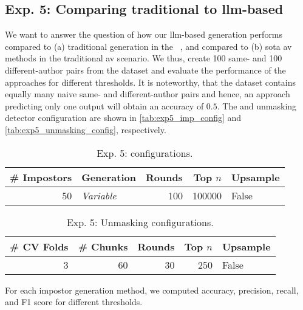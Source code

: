 \subsection{Exp. 5: Comparing traditional to \ac{llm}-based \imps{}}
\label{subsec:imp_gen}

We want to answer the question of how our \ac{llm}-based \imp{} generation performs compared to (a) traditional \imp{} generation in the \impAppr{}~\citep{koppel_determining_2014}, and compared to (b) \ac{sota} \ac{av} methods in the traditional \ac{av} scenario.
We thus, create 100 same- and 100 different-author pairs from the \dataStudent{} 
dataset and evaluate the performance of the approaches for different thresholds.
It is noteworthy, that the dataset contains equally many naive same- and different-author pairs and hence, an approach predicting only one output will obtain an accuracy of $0.5$.
The \impAppr{} and unmasking detector configuration are shown in \autoref{tab:exp5_imp_config} and \autoref{tab:exp5_unmasking_config}, respectively.

\begin{table}[h]
\centering\small
\caption{Exp. 5: \impAppr{} configurations.}
\label{tab:exp5_imp_config}
\begin{tabular}{@{}rlrrl@{}}   %
\toprule
\# Impostors & Generation & Rounds & Top $n$ & Upsample \\
\midrule
50 & \textit{Variable} & 100 & \num{100000} & False \\
\bottomrule
\end{tabular}%
\end{table}

\begin{table}[h]
\centering\small
\caption{Exp. 5: Unmasking configurations.}
\label{tab:exp5_unmasking_config}
\begin{tabular}{@{}rrrrl@{}}   %
\toprule
\# CV Folds & \# Chunks & Rounds & Top $n$ & Upsample \\
\midrule
3 & 60 & 30 & \num{250} & False \\
\bottomrule
\end{tabular}%
\end{table}

For each impostor generation method, we computed accuracy, precision, recall, and F1 score for different thresholds. 
